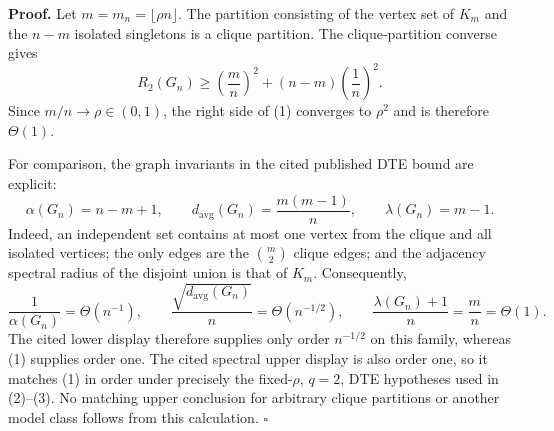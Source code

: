\textbf{Proof.}
Let \(m=m_n=\lfloor\rho n\rfloor\). The partition consisting of the vertex set of \(K_m\) and the \(n-m\) isolated singletons is a clique partition. The clique-partition converse gives
\[
R_2(G_n)\geq\left(\frac mn\right)^2+(n-m)\left(\frac1n\right)^2.
\tag{1}
\]
Since \(m/n\to\rho\in(0,1)\), the right side of (1) converges to \(\rho^2\) and is therefore \(\Theta(1)\).

For comparison, the graph invariants in the cited published DTE bound are explicit:
\[
\alpha(G_n)=n-m+1,
\qquad
d_{\mathrm{avg}}(G_n)=\frac{m(m-1)}n,
\qquad
\lambda(G_n)=m-1.
\tag{2}
\]
Indeed, an independent set contains at most one vertex from the clique and all isolated vertices; the only edges are the \(\binom m2\) clique edges; and the adjacency spectral radius of the disjoint union is that of \(K_m\). Consequently,
\[
\frac1{\alpha(G_n)}=\Theta(n^{-1}),
\qquad
\frac{\sqrt{d_{\mathrm{avg}}(G_n)}}n=\Theta(n^{-1/2}),
\qquad
\frac{\lambda(G_n)+1}{n}=\frac mn=\Theta(1).
\tag{3}
\]
The cited lower display therefore supplies only order \(n^{-1/2}\) on this family, whereas (1) supplies order one. The cited spectral upper display is also order one, so it matches (1) in order under precisely the fixed-\(\rho\), \(q=2\), DTE hypotheses used in (2)--(3). No matching upper conclusion for arbitrary clique partitions or another model class follows from this calculation. \(\square\)